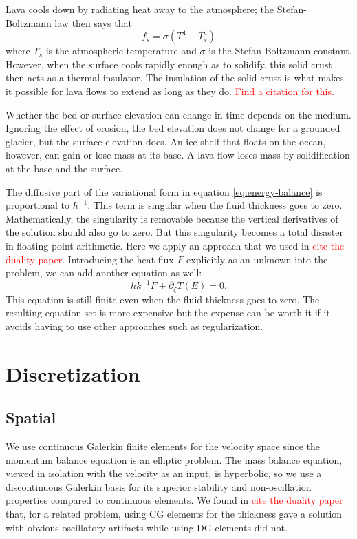 \documentclass{article}
\theoremstyle{definition}
\theoremstyle{plain}
\begin{document}
Lava cools down by radiating heat away to the atmosphere; the Stefan-Boltzmann law then says that
\begin{equation}
    f_s = \sigma(T^4 - T_s^4)
\end{equation}
where $T_s$ is the atmospheric temperature and $\sigma$ is the Stefan-Boltzmann constant.
However, when the surface cools rapidly enough as to solidify, this solid crust then acts as a thermal insulator.
The insulation of the solid crust is what makes it possible for lava flows to extend as long as they do.
\textcolor{red}{Find a citation for this.}

Whether the bed or surface elevation can change in time depends on the medium.
Ignoring the effect of erosion, the bed elevation does not change for a grounded glacier, but the surface elevation does.
An ice shelf that floats on the ocean, however, can gain or lose mass at its base.
A lava flow loses mass by solidification at the base and the surface.

The diffusive part of the variational form in equation \eqref{eq:energy-balance} is proportional to $h^{-1}$.
This term is singular when the fluid thickness goes to zero.
Mathematically, the singularity is removable because the vertical derivatives of the solution should also go to zero.
But this singularity becomes a total disaster in floating-point arithmetic.
Here we apply an approach that we used in \textcolor{red}{cite the duality paper}.
Introducing the heat flux $F$ explicitly as an unknown into the problem, we can add another equation as well:
\begin{equation}
    hk^{-1}F + \partial_\zeta T(E) = 0.
\end{equation}
This equation is still finite even when the fluid thickness goes to zero.
The resulting equation set is more expensive but the expense can be worth it if it avoids having to use other approaches such as regularization.


\section{Discretization}

\subsection{Spatial}

We use continuous Galerkin finite elements for the velocity space since the momentum balance equation is an elliptic problem.
The mass balance equation, viewed in isolation with the velocity as an input, is hyperbolic, so we use a discontinuous Galerkin basis for its superior stability and non-oscillation properties compared to continuous elements.
We found in \textcolor{red}{cite the duality paper} that, for a related problem, using CG elements for the thickness gave a solution with obvious oscillatory artifacts while using DG elements did not.
\end{document}
